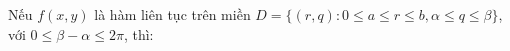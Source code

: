\documentclass[preview]{standalone}
\begin{document}
\begin{center}
Nếu $f(x, y)$ là hàm liên tục trên miền $D = \{(r, q): 0 \leq a \leq r \leq b, \alpha \leq q \leq \beta\}$, với $0 \leq \beta - \alpha \leq 2\pi$, thì:
\end{center}
\end{document}
